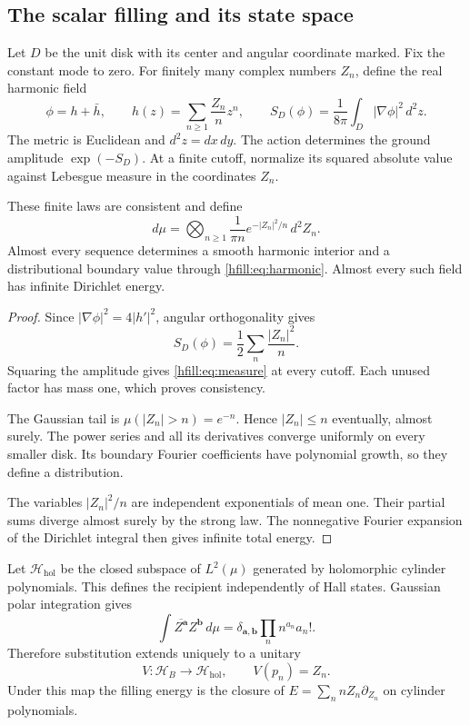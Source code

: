 \subsection{The scalar filling and its state space}

Let $D$ be the unit disk with its center and angular coordinate marked.
Fix the constant mode to zero.
For finitely many complex numbers $Z_n$, define the real harmonic field
\begin{equation}\label{hfill:eq:harmonic}
 \phi=h+\bar h,\qquad
 h(z)=\sum_{n\geq1}\frac{Z_n}{n}z^n,
 \qquad
 S_D(\phi)=\frac1{8\pi}\int_D|\nabla\phi|^2\,d^2z.
\end{equation}
The metric is Euclidean and $d^2z=dx\,dy$.
The action determines the ground amplitude $\exp(-S_D)$.
At a finite cutoff, normalize its squared absolute value against
Lebesgue measure in the coordinates $Z_n$.

\begin{proposition}\label{hfill:prop:measure}
These finite laws are consistent and define
\begin{equation}\label{hfill:eq:measure}
 d\mu=\bigotimes_{n\geq1}
       \frac1{\pi n}e^{-|Z_n|^2/n}\,d^2Z_n.
\end{equation}
Almost every sequence determines a smooth harmonic interior and a
distributional boundary value through \eqref{hfill:eq:harmonic}.
Almost every such field has infinite Dirichlet energy.
\end{proposition}

\begin{proof}
Since $|\nabla\phi|^2=4|h'|^2$, angular orthogonality gives
\[
 S_D(\phi)=\frac12\sum_n\frac{|Z_n|^2}{n}.
\]
Squaring the amplitude gives \eqref{hfill:eq:measure} at every cutoff.
Each unused factor has mass one, which proves consistency.

The Gaussian tail is
$\mu(|Z_n|>n)=e^{-n}$.
Hence $|Z_n|\leq n$ eventually, almost surely.
The power series and all its derivatives converge uniformly on
every smaller disk.
Its boundary Fourier coefficients have polynomial growth, so they
define a distribution.

The variables $|Z_n|^2/n$ are independent exponentials of mean one.
Their partial sums diverge almost surely by the strong law.
The nonnegative Fourier expansion of the Dirichlet integral then
gives infinite total energy.
\end{proof}

Let $\mathcal H_{\mathrm{hol}}$ be the closed subspace of
$L^2(\mu)$ generated by holomorphic cylinder polynomials.
This defines the recipient independently of Hall states.
Gaussian polar integration gives
\[
 \int\overline{Z^{\boldsymbol a}}Z^{\boldsymbol b}\,d\mu
 =\delta_{\boldsymbol a,\boldsymbol b}
       \prod_n n^{a_n}a_n!.
\]
Therefore substitution extends uniquely to a unitary
\begin{equation}\label{hfill:eq:V}
 V:\mathcal H_B\longrightarrow\mathcal H_{\mathrm{hol}},
 \qquad V(p_n)=Z_n.
\end{equation}
Under this map the filling energy is the closure of
$E=\sum_n nZ_n\partial_{Z_n}$ on cylinder polynomials.

